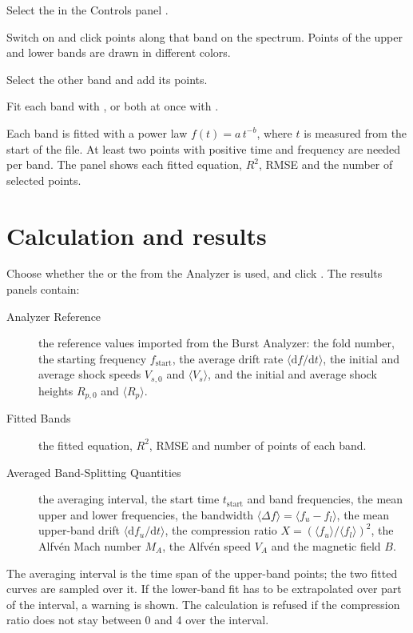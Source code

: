 \begin{steps}
  \item Select the  in the Controls panel .
  \item Switch on   and click points along that band on the
    spectrum. Points of the upper and lower bands are drawn in different colors.
  \item Select the other band and add its points.
  \item Fit each band with  , or both at once with
     .
\end{steps}
Each band is fitted with a power law \(f(t) = a\,t^{-b}\), where \(t\) is measured from the
start of the file. At least two points with positive time and frequency are needed per
band. The  panel shows each fitted equation, \(R^2\), RMSE and the number
of selected points.

\section{Calculation and results}
\label{sec:bs-results}

Choose whether the  or the  from the
Analyzer is used, and click . The results panels contain:
\begin{description}
  \item[Analyzer Reference] the reference values imported from the Burst Analyzer: the
    fold number, the starting frequency \(f_\mathrm{start}\), the average drift rate
    \(\langle\mathrm{d}f/\mathrm{d}t\rangle\), the initial and average shock speeds
    \(V_{s,0}\) and \(\langle V_s\rangle\), and the initial and average shock heights
    \(R_{p,0}\) and \(\langle R_p\rangle\).
  \item[Fitted Bands] the fitted equation, \(R^2\), RMSE and number of points of each band.
  \item[Averaged Band-Splitting Quantities] the averaging interval, the start time
    \(t_\mathrm{start}\) and band frequencies, the mean upper and lower frequencies, the
    bandwidth \(\langle\Delta f\rangle = \langle f_u - f_l\rangle\), the mean upper-band
    drift \(\langle\mathrm{d}f_u/\mathrm{d}t\rangle\), the compression ratio
    \(X = (\langle f_u\rangle/\langle f_l\rangle)^2\), the Alfvén Mach number \(M_A\), the
    Alfvén speed \(V_A\) and the magnetic field \(B\).
\end{description}
The averaging interval is the time span of the upper-band points; the two fitted curves are
sampled over it. If the lower-band fit has to be extrapolated over part of the interval, a
warning is shown. The calculation is refused if the compression ratio does not stay
between 0 and 4 over the interval.

